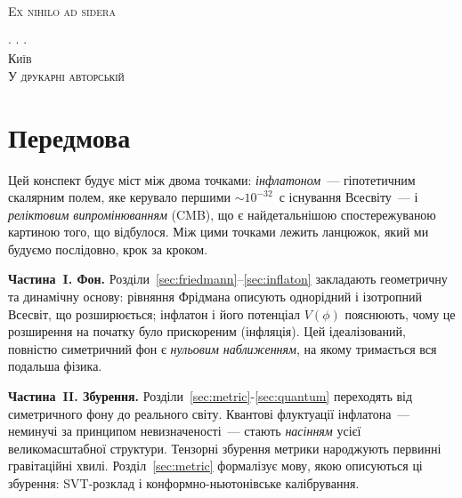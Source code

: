 \documentclass[12pt, a4paper, openany]{book}
\begin{document}
\begin{titlepage}
	\vfill

	{\scshape\small Ex nihilo ad sidera}

	\vspace{0.3cm}

	{\large $\cdot$ \hrulefill $\cdot$ \hrulefill $\cdot$} \\[0.2cm]

	{\scshape Київ} \\[0.1cm]
	{\scshape У друкарні авторській} \\[0.1cm]
	{\small \scshape \uppercase\expandafter{\romannumeral\year}}

\end{titlepage}
\nopagecolor
\clearpage

\tableofcontents

\chapter*{Передмова}

Цей конспект будує міст між двома точками: \emph{інфлатоном}~---
гіпотетичним скалярним полем, яке керувало першими
${\sim}10^{-32}$~с існування Всесвіту~--- і \emph{реліктовим випромінюванням} (CMB),
що є найдетальнішою спостережуваною картиною того, що відбулося.
Між цими точками лежить ланцюжок, який ми будуємо
послідовно, крок за кроком.

\textbf{Частина~I. Фон.} Розділи~\ref{sec:friedmann}–\ref{sec:inflaton}
закладають геометричну та динамічну основу: рівняння Фрідмана описують
однорідний і ізотропний Всесвіт, що розширюється; інфлатон і його
потенціал $V(\phi)$ пояснюють, чому це розширення на початку було
прискореним (інфляція). Цей ідеалізований, повністю симетричний фон є
\emph{нульовим наближенням}, на якому тримається вся подальша фізика.

\textbf{Частина~II. Збурення.} Розділи~\ref{sec:metric}-\ref{sec:quantum}
переходять від симетричного фону до реального світу. Квантові флуктуації
інфлатона~--- неминучі за принципом невизначеності~--- стають
\emph{насінням} усієї великомасштабної структури. Тензорні збурення
метрики народжують первинні гравітаційні хвилі. Розділ~\ref{sec:metric}
формалізує мову, якою описуються ці збурення: SVT-розклад і
конформно-ньютонівське калібрування.
\end{document}
